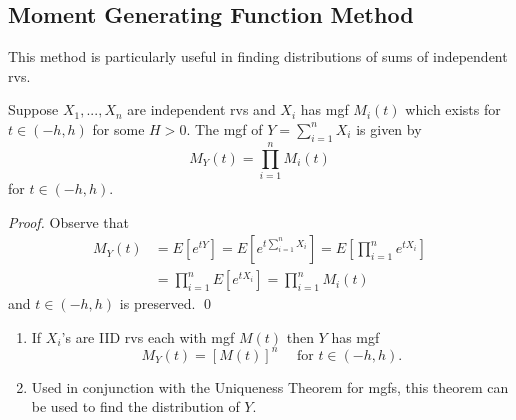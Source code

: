 \documentclass[notoc,notitlepage]{tufte-book}
\begin{document}

\subsection{Moment Generating Function Method}%
\label{sub:moment_generating_function_method}

This method is particularly useful in finding distributions of sums of independent rvs.

\begin{thm}
\label{thm:sums_of_mgf}
Suppose $X_1, ..., X_n$ are independent rvs and $X_i$ has mgf $M_i(t)$ which exists for $t \in (-h, h)$ for some $H > 0$. The mgf of $Y = \sum_{i=1}^{n} X_i$ is given by
\begin{equation*}
  M_Y(t) = \prod_{i=1}^{n} M_i(t)
\end{equation*}
for $t \in (-h, h)$.
\end{thm}

\begin{proof}
  Observe that
  \begin{align*}
    M_Y(t) &= E\left[ e^{tY} \right] = E\left[ e^{t \sum_{i=1}^{n} X_i} \right] = E\left[ \prod_{i=1}^{n} e^{tX_i} \right] \\
           &= \prod_{i=1}^{n} E\left[ e^{tX_i} \right] = \prod_{i=1}^{n} M_i(t)
  \end{align*}
  and $t \in (-h, h)$ is preserved. \qed
\end{proof}

\begin{note}
  \begin{enumerate}
    \item If $X_i$'s are IID rvs each with mgf $M(t)$ then $Y$ has mgf
      \begin{equation*}
        M_Y(t) = [ M(t) ]^n \quad \text{ for } t \in (-h, h).
      \end{equation*}

    \item Used in conjunction with the Uniqueness Theorem for mgfs, this theorem can be used to find the distribution of $Y$.
  \end{enumerate}
\end{note}
\end{document}
